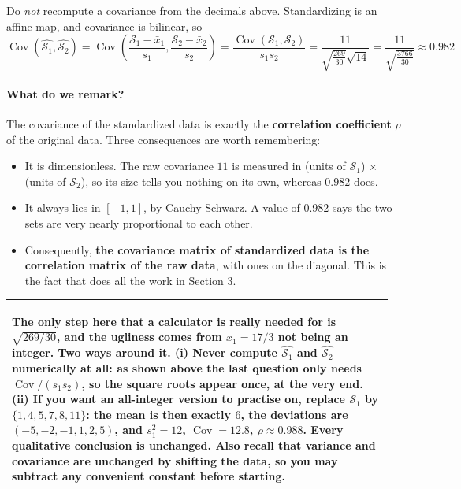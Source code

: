 \documentclass[]{article}
\makeatletter
\newcommand{\Cov}{\operatorname{Cov}}
\newenvironment{simplify}{%
	\par\medskip\noindent
	\begin{tabular}{@{}p{0.965\linewidth}@{}}
		\hline\rule{0pt}{2.6ex}\itshape
}{%
		\\[0.6ex]\hline
	\end{tabular}
	\par\medskip
}
\makeatother
\begin{document}
	Do \emph{not} recompute a covariance from the decimals above.
	Standardizing is an affine map, and covariance is bilinear, so
	$$
	\Cov\!\left(\hat{\mathcal{S}_1}, \hat{\mathcal{S}_2}\right)
	= \Cov\!\left( \frac{\mathcal{S}_1 - \bar{x}_1}{s_1}, \frac{\mathcal{S}_2 - \bar{x}_2}{s_2} \right)
	= \frac{\Cov(\mathcal{S}_1, \mathcal{S}_2)}{s_1 s_2}
	= \frac{11}{\sqrt{\frac{269}{30}} \sqrt{14}}
	= \frac{11}{\sqrt{\frac{3766}{30}}}
	\approx 0.982
	$$

	\paragraph{What do we remark?}\mbox{}

	The covariance of the standardized data is exactly the \textbf{correlation coefficient} $\rho$ of the original data.
	Three consequences are worth remembering:
	\begin{itemize}
		\item It is dimensionless.
		The raw covariance $11$ is measured in (units of $\mathcal{S}_1$) $\times$ (units of $\mathcal{S}_2$), so its size tells you nothing on its own, whereas $0.982$ does.
		\item It always lies in $[-1, 1]$, by Cauchy-Schwarz.
		A value of $0.982$ says the two sets are very nearly proportional to each other.
		\item Consequently, \textbf{the covariance matrix of standardized data is the correlation matrix of the raw data}, with ones on the diagonal.
		This is the fact that does all the work in Section 3.
	\end{itemize}

	\begin{simplify}
		The only step here that a calculator is really needed for is $\sqrt{269/30}$, and the ugliness comes from $\bar{x}_1 = 17/3$ not being an integer.
		Two ways around it.
		(i) Never compute $\hat{\mathcal{S}_1}$ and $\hat{\mathcal{S}_2}$ numerically at all: as shown above the last question only needs $\Cov / (s_1 s_2)$, so the square roots appear once, at the very end.
		(ii) If you want an all-integer version to practise on, replace $\mathcal{S}_1$ by $\{1, 4, 5, 7, 8, 11\}$: the mean is then exactly $6$, the deviations are $(-5, -2, -1, 1, 2, 5)$, and $s_1^2 = 12$, $\Cov = 12.8$, $\rho \approx 0.988$.
		Every qualitative conclusion is unchanged.
		Also recall that variance and covariance are unchanged by shifting the data, so you may subtract any convenient constant before starting.
	\end{simplify}
\end{document}
